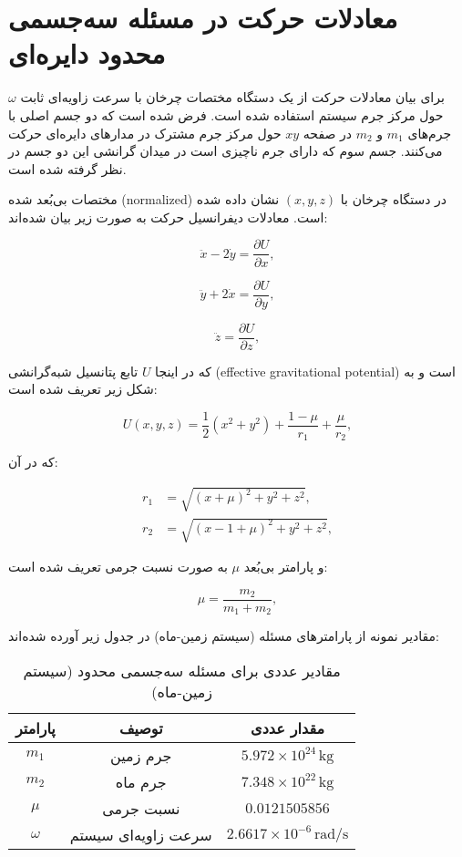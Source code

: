 \section{معادلات حرکت در مسئله سه‌جسمی محدود دایره‌ای}

برای بیان معادلات حرکت از یک دستگاه مختصات چرخان با سرعت زاویه‌ای ثابت $\omega$ حول مرکز جرم سیستم استفاده شده است. فرض شده است که دو جسم اصلی با جرم‌های $m_1$ و $m_2$ در صفحه $xy$ حول مرکز جرم مشترک در مدارهای دایره‌ای حرکت می‌کنند. جسم سوم که دارای جرم ناچیزی است در میدان گرانشی این دو جسم در نظر گرفته شده است.

مختصات بی‌بُعد شده (normalized) در دستگاه چرخان با $(x,y,z)$ نشان داده شده است. معادلات دیفرانسیل حرکت به صورت زیر بیان شده‌اند:

\begin{equation}
	\ddot{x} - 2\dot{y} = \dfrac{\partial U}{\partial x},
\end{equation}

\begin{equation}
	\ddot{y} + 2\dot{x} = \dfrac{\partial U}{\partial y},
\end{equation}

\begin{equation}
	\ddot{z} = \dfrac{\partial U}{\partial z},
\end{equation}

که در اینجا $U$ تابع پتانسیل شبه‌گرانشی (effective gravitational potential) است و به شکل زیر تعریف شده است:

\begin{equation}
	U(x,y,z) = \dfrac{1}{2}(x^2 + y^2) + \dfrac{1-\mu}{r_1} + \dfrac{\mu}{r_2},
\end{equation}

که در آن:

\begin{align}
	r_1 &= \sqrt{(x+\mu)^2 + y^2 + z^2},\\[6pt]
	r_2 &= \sqrt{(x-1+\mu)^2 + y^2 + z^2},
\end{align}

و پارامتر بی‌بُعد $\mu$ به صورت نسبت جرمی تعریف شده است:

\begin{equation}
	\mu = \dfrac{m_2}{m_1 + m_2},
\end{equation}

مقادیر نمونه از پارامترهای مسئله (سیستم زمین-ماه) در جدول زیر آورده شده‌اند:

\begin{table}[H]
	\centering
	\caption{مقادیر عددی برای مسئله سه‌جسمی محدود (سیستم زمین-ماه)}
	\begin{tabular}{|c|c|c|}
		\hline
		پارامتر & توصیف & مقدار عددی \\
		\hline
		$m_1$ & جرم زمین & $5.972 \times 10^{24}\,\mathrm{kg}$ \\
		$m_2$ & جرم ماه & $7.348 \times 10^{22}\,\mathrm{kg}$ \\
		$\mu$ & نسبت جرمی & $0.0121505856$ \\
		$\omega$ & سرعت زاویه‌ای سیستم & $2.6617 \times 10^{-6}\,\mathrm{rad/s}$ \\
		\hline
	\end{tabular}
	\label{tab:params}
\end{table}

